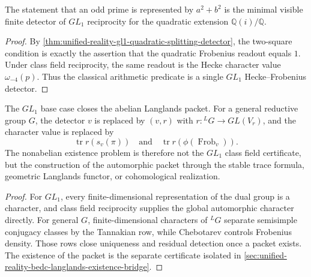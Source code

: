 \begin{corollary}
\label{cor:unified-reality-two-square-minimal-langlands-detector}
The statement that an odd prime is represented by $a^2+b^2$ is the
minimal visible finite detector of $GL_1$ reciprocity for the quadratic
extension $\mathbb Q(i)/\mathbb Q$.
\end{corollary}
\begin{proof}
By
\autoref{thm:unified-reality-gl1-quadratic-splitting-detector}, the
two-square condition is exactly the assertion that the quadratic
Frobenius readout equals $1$. Under class field reciprocity, the same
readout is the Hecke character value $\omega_{-4}(p)$. Thus the
classical arithmetic predicate is a single $GL_1$ Hecke--Frobenius
detector.
\end{proof}

\begin{theorem}
\label{thm:unified-reality-gl1-nonabelian-lift-boundary}
The $GL_1$ base case closes the abelian Langlands packet. For a general
reductive group $G$, the detector $v$ is replaced by $(v,r)$ with
$r:{}^LG\to GL(V_r)$, and the character value is replaced by
$$
\operatorname{tr}r(s_v(\pi))
\quad\text{and}\quad
\operatorname{tr}r(\phi(\operatorname{Frob}_v)).
$$
The nonabelian existence problem is therefore not the $GL_1$ class field
certificate, but the construction of the automorphic packet through the
stable trace formula, geometric Langlands functor, or cohomological
realization.
\end{theorem}
\begin{proof}
For $GL_1$, every finite-dimensional representation of the dual group is
a character, and class field reciprocity supplies the global
automorphic character directly. For general $G$, finite-dimensional
characters of ${}^LG$ separate semisimple conjugacy classes by the
Tannakian row, while Chebotarev controls Frobenius density. Those rows
close uniqueness and residual detection once a packet exists. The
existence of the packet is the separate certificate isolated in
\autoref{sec:unified-reality-bedc-langlands-existence-bridge}.
\end{proof}

